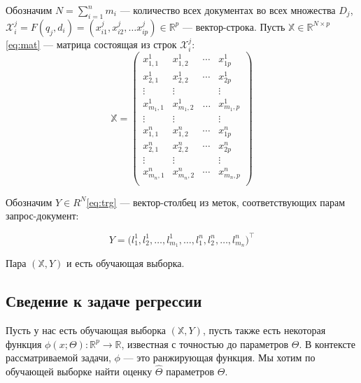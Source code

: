 \documentclass[specialist,
               substylefile = spbu.rtx,
               subf,href,colorlinks=true, 12pt]{disser}
\begin{document}
Обозначим $N = \sum_{i=1}^{n}{m_i}$ --- количество всех документах во всех множества $D_j$, $\mathcal X^j_i = F(q_j, d_i)  = (x^j_{i1}, x^j_{i2}, \ldots x^j_{ip})\in \mathbb R^p$ --- вектор-строка. Пусть $\mathbb X \in \mathbb R ^ {N \times p}$\eqref{eq:mat} --- матрица состоящая из строк $\mathcal X^j_i$:\\

\begin{equation}
\label{eq:mat}
\mathbb X =
\begin{pmatrix}
x^1_{1, 1} & x^1_{1, 2} & \cdots & x^1_{1p} \\
x^1_{2, 1} & x^1_{2, 2} & \cdots & x^1_{2p} \\
\vdots & \vdots &  & \vdots \\
x^1_{m_1, 1} & x^1_{m_1, 2} & \ldots & x^1_{m_1, p} \\
\vdots & \vdots &  & \vdots \\
x^n_{1, 1} & x^n_{1, 2} & \cdots & x^n_{1p} \\
x^n_{2, 1} & x^n_{2, 2} & \cdots & x^n_{2p} \\
\vdots & \vdots &  & \vdots \\
x^n_{m_n, 1} & x^n_{m_n, 2} & \cdots & x^n_{m_n, p} \\
\end{pmatrix}
\end{equation}

Обозначим $Y \in R^N$\eqref{eq:trg} --- вектор-столбец из меток, соответствующих парам запрос-документ:

\begin{equation}
\label{eq:trg}
Y = \big( l^1_1, l^1_2, \ldots, l^1_{m_1}, \ldots, l^n_1, l^n_2, \ldots, l^n_{m_n}\big)^\intercal
\end{equation}

Пара $(\mathbb X, Y)$ и есть обучающая выборка.

\subsection{Сведение к задаче регрессии}

Пусть у нас есть обучающая выборка $(\mathbb X, Y)$, пусть также есть некоторая функция $\phi(x; \Theta): \mathbb R^p \rightarrow \mathbb R$, известная с точностью до параметров $\Theta$. В контексте рассматриваемой задачи, $\phi$ --- это ранжирующая функция. Мы хотим по обучающей выборке найти оценку $\hat\Theta$ параметров $\Theta$.\par
\end{document}
